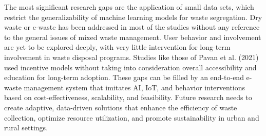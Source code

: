 The most significant research gaps are the application of small data sets, which restrict the generalizability of machine learning models for waste segregation. Dry waste or e-waste has been addressed in most of the studies without any reference to the general issues of mixed waste management. User behavior and involvement are yet to be explored deeply, with very little intervention for long-term involvement in waste disposal programs. Studies like those of Pavan et al. (2021) used incentive models without taking into consideration overall accessibility and education for long-term adoption. These gaps can be filled by an end-to-end e-waste management system that imitates AI, IoT, and behavior interventions based on cost-effectiveness, scalability, and feasibility. Future research needs to create adaptive, data-driven solutions that enhance the efficiency of waste collection, optimize resource utilization, and promote sustainability in urban and rural settings.




